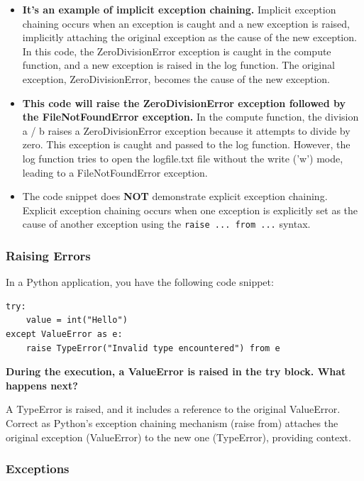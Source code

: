 \begin{itemize}
\item \textbf{It's an example of implicit exception chaining.} Implicit exception chaining occurs when an exception is caught and a new exception is raised, implicitly attaching the original exception as the cause of the new exception. In this code, the ZeroDivisionError exception is caught in the compute function, and a new exception is raised in the log function. The original exception, ZeroDivisionError, becomes the cause of the new exception.


\item \textbf{This code will raise the ZeroDivisionError exception followed by the FileNotFoundError exception.} In the compute function, the division a / b raises a ZeroDivisionError exception because it attempts to divide by zero. This exception is caught and passed to the log function. However, the log function tries to open the logfile.txt file without the write ('w') mode, leading to a FileNotFoundError exception.

\item The code snippet does \textbf{NOT} demonstrate explicit exception chaining. Explicit exception chaining occurs when one exception is explicitly set as the cause of another exception using the \texttt{raise ... from ...} syntax.
\end{itemize}

\subsubsection{Raising Errors}
In a Python application, you have the following code snippet:

\begin{codebox}
\begin{verbatim}
try:
    value = int("Hello")
except ValueError as e:
    raise TypeError("Invalid type encountered") from e
\end{verbatim}
\end{codebox}

\textbf{During the execution, a ValueError is raised in the try block. What happens next?}

A TypeError is raised, and it includes a reference to the original ValueError. Correct as Python's exception chaining mechanism (raise from) attaches the original exception (ValueError) to the new one (TypeError), providing context.

\newpage
\subsubsection{Exceptions}

